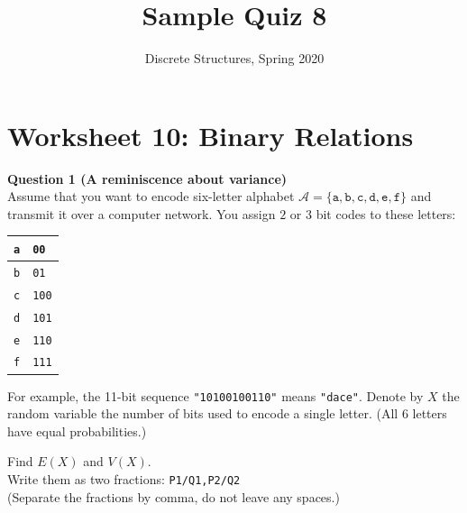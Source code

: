 \documentclass[jou]{apa6}
\title{Sample Quiz 8}
\author{Discrete Structures, Spring 2020}
\affiliation{RBS}
\begin{document}

\twocolumn
\section{Worksheet 10: Binary Relations}

\vspace{6pt}
{\bf Question 1 (A reminiscence about variance)}\\
Assume that you want to encode six-letter alphabet 
$\mathcal{A} = \{ \mathtt{a}, \mathtt{b}, \mathtt{c}, \mathtt{d}, \mathtt{e}, \mathtt{f} \}$
and transmit it over a computer network.
You assign $2$ or $3$ bit codes to these letters: 

\begin{tabular}{|l|l|} \hline
{\tt a} & {\tt 00} \\ \hline
{\tt b} & {\tt 01} \\ \hline
{\tt c} & {\tt 100} \\ \hline
{\tt d} & {\tt 101} \\ \hline
{\tt e} & {\tt 110} \\ \hline
{\tt f} & {\tt 111} \\ \hline
\end{tabular}

For example, the 11-bit sequence {\tt "10100100110"} means {\tt "dace"}.
Denote by $X$ the random variable \textendash{} the number of 
bits used to encode a single letter. (All $6$ letters have 
equal probabilities.)

Find $E(X)$ and $V(X)$.\\
Write them as two fractions: {\tt P1/Q1,P2/Q2}\\
(Separate the fractions by comma, 
do not leave any spaces.)
\end{document}
